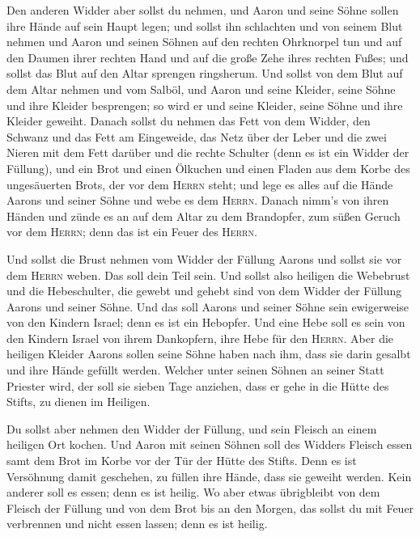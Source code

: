  Den anderen Widder aber sollst du nehmen, und Aaron und
seine Söhne sollen ihre Hände auf sein Haupt legen;  und
sollst ihn schlachten und von seinem Blut nehmen und Aaron und seinen
Söhnen auf den rechten Ohrknorpel tun und auf den Daumen ihrer rechten
Hand und auf die große Zehe ihres rechten Fußes; und sollst das Blut auf
den Altar sprengen ringsherum.  Und sollst von dem Blut
auf dem Altar nehmen und vom Salböl, und Aaron und seine Kleider, seine
Söhne und ihre Kleider besprengen; so wird er und seine Kleider, seine
Söhne und ihre Kleider geweiht.  Danach sollst du nehmen
das Fett von dem Widder, den Schwanz und das Fett am Eingeweide, das
Netz über der Leber und die zwei Nieren mit dem Fett darüber und die
rechte Schulter (denn es ist ein Widder der Füllung), 
und ein Brot und einen Ölkuchen und einen Fladen aus dem Korbe des
ungesäuerten Brots, der vor dem \textsc{Herrn} steht; 
und lege es alles auf die Hände Aarons und seiner Söhne und webe es dem
\textsc{Herrn}.  Danach nimm's von ihren Händen und zünde
es an auf dem Altar zu dem Brandopfer, zum süßen Geruch vor dem
\textsc{Herrn}; denn das ist ein Feuer des \textsc{Herrn}.

 Und sollst die Brust nehmen vom Widder der Füllung
Aarons und sollst sie vor dem \textsc{Herrn} weben. Das soll dein Teil
sein.  Und sollst also heiligen die Webebrust und die
Hebeschulter, die gewebt und gehebt sind von dem Widder der Füllung
Aarons und seiner Söhne.  Und das soll Aarons und seiner
Söhne sein ewigerweise von den Kindern Israel; denn es ist ein Hebopfer.
Und eine Hebe soll es sein von den Kindern Israel von ihrem Dankopfern,
ihre Hebe für den \textsc{Herrn}.  Aber die heiligen
Kleider Aarons sollen seine Söhne haben nach ihm, dass sie darin gesalbt
und ihre Hände gefüllt werden.  Welcher unter seinen
Söhnen an seiner Statt Priester wird, der soll sie sieben Tage anziehen,
dass er gehe in die Hütte des Stifts, zu dienen im Heiligen.

 Du sollst aber nehmen den Widder der Füllung, und sein
Fleisch an einem heiligen Ort kochen.  Und Aaron mit
seinen Söhnen soll des Widders Fleisch essen samt dem Brot im Korbe vor
der Tür der Hütte des Stifts.  Denn es ist Versöhnung
damit geschehen, zu füllen ihre Hände, dass sie geweiht werden. Kein
anderer soll es essen; denn es ist heilig.  Wo aber etwas
übrigbleibt von dem Fleisch der Füllung und von dem Brot bis an den
Morgen, das sollst du mit Feuer verbrennen und nicht essen lassen; denn
es ist heilig.

